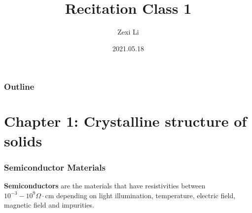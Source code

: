 \documentclass{beamer}
\begin{document}
\renewcommand{\d}{\: \mathrm{d} }
\newcommand{\e}{\mathrm{e}}


\title[] {Recitation Class 1}

\author[lzx]{Zexi Li}


\date{2021.05.18}

\frame{\titlepage}


\begin{frame}
    \frametitle{Outline}
    \tableofcontents
\end{frame}

\section{Chapter 1: Crystalline structure of solids}
    \begin{frame} \frametitle{Semiconductor Materials}
            \begin{table}[H]
                \caption{Semiconductor}
                \label{tab:Semiconductor}
            \end{table}

        \par \textbf{Semiconductors} are the materials that have resistivities between $10^{-3} - 10^9 \Omega \cdot \text{cm}$ depending on light illumination, temperature, electric field, magnetic field and impurities.
    \end{frame}
\end{document}
